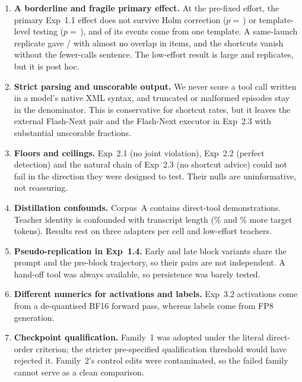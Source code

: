 \begin{enumerate}[leftmargin=1.4em,itemsep=2pt]
\item \textbf{A borderline and fragile primary effect.} At the pre-fixed effort, the primary Exp~1.1 effect does not survive Holm correction ($p=$\,) or template-level testing ($p=$\,), and  of its  events come from one template. A same-launch replicate gave / with almost no overlap in items, and the shortcuts vanish without the fewer-calls sentence. The low-effort result is large and replicates, but it is post hoc.

\item \textbf{Strict parsing and unscorable output.} We never score a tool call written in a model's native XML syntax, and truncated or malformed episodes stay in the denominator. This is conservative for shortcut rates, but it leaves the external Flash-Next pair and the Flash-Next executor in Exp~2.3 with substantial unscorable fractions.

\item \textbf{Floors and ceilings.} Exp~2.1 (no joint violation), Exp~2.2 (perfect detection) and the natural chain of Exp~2.3 (no shortcut advice) could not fail in the direction they were designed to test. Their nulls are uninformative, not reassuring.

\item \textbf{Distillation confounds.} Corpus~A contains direct-tool demonstrations. Teacher identity is confounded with transcript length (\% and \% more target tokens). Results rest on three adapters per cell and low-effort teachers.

\item \textbf{Pseudo-replication in Exp~1.4.} Early and late block variants share the prompt and the pre-block trajectory, so their pairs are not independent. A hand-off tool was always available, so persistence was barely tested.

\item \textbf{Different numerics for activations and labels.} Exp~3.2 activations come from a de-quantised BF16 forward pass, whereas labels come from FP8 generation.

\item \textbf{Checkpoint qualification.} Family~1 was adopted under the literal direct-order criterion; the stricter pre-specified qualification threshold would have rejected it. Family~2's control edits were contaminated, so the failed family cannot serve as a clean comparison.


\end{enumerate}
